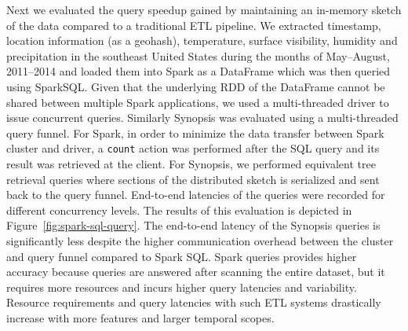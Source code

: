 %
Next we evaluated the query speedup gained by maintaining an in-memory sketch of the data compared to a traditional ETL pipeline.
We extracted timestamp, location information (as a geohash), temperature, surface visibility, humidity and precipitation in the southeast United States during the months of May--August, 2011--2014 and loaded them into Spark as a DataFrame which was then queried using SparkSQL.
Given that the underlying RDD of the DataFrame cannot be shared between multiple Spark applications, we used a multi-threaded driver to issue concurrent queries.
Similarly Synopsis was evaluated using a multi-threaded query funnel.
For Spark, in order to minimize the data transfer between Spark cluster and driver, a \texttt{count} action was performed after the SQL query and its result was retrieved at the client.
For Synopsis, we performed equivalent tree retrieval queries where sections of the distributed sketch is serialized and sent back to the query funnel.
End-to-end latencies of the queries were recorded for different concurrency levels.
The results of this evaluation is depicted in Figure~\ref{fig:spark-sql-query}.
The end-to-end latency of the Synopsis queries is significantly less despite the higher communication overhead between the cluster and query funnel compared to Spark SQL.
Spark queries provides higher accuracy because queries are answered after scanning the entire dataset, but it requires more resources and incurs higher query latencies and variability.
Resource requirements and query latencies with such ETL systems drastically increase with more features and larger temporal scopes.

